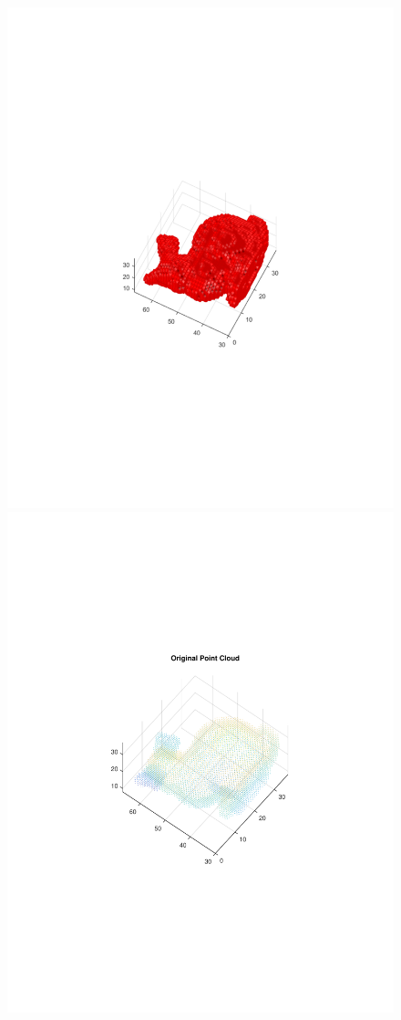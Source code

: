\documentclass{UCF_ETD}
\begin{document}
\begin{figure}[H] 
\begin{center}
\includegraphics[scale=0.5]{RobustRegistration/OriginalBunnyObject}
\includegraphics[scale=0.5]{RobustRegistration/OriginalBunnyObject_pointCloud}

\end{center}
\end{figure}
\end{document}
